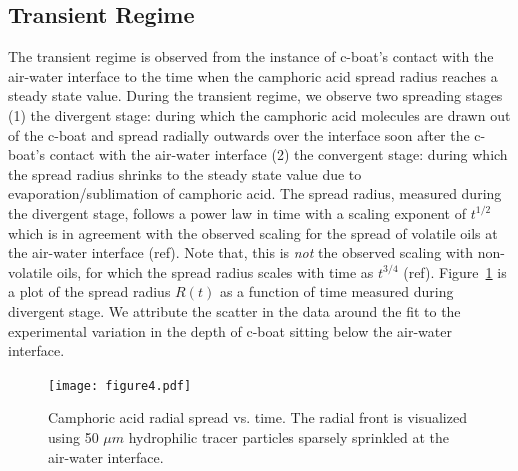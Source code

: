 \documentclass[aps, twocolumn, floatfix, superscriptaddress]{revtex4}
\begin{document}
\subsection{Transient Regime}
\label{sec:transient}
The transient regime is observed from the instance of c-boat's contact with the air-water interface to the time when the camphoric acid spread radius reaches a steady state value. During the transient regime, we observe two spreading stages (1) the divergent stage: during which the camphoric acid molecules are drawn out of the c-boat and spread radially outwards over the interface soon after the c-boat's contact with the air-water interface (2) the convergent stage: during which the spread radius shrinks to the steady state value due to evaporation/sublimation of camphoric acid. The spread radius, measured during the divergent stage, follows a power law in time with a scaling exponent of $t^{1/2}$ which is in agreement with the observed scaling for the spread of volatile oils at the air-water interface (ref). Note that, this is \emph{not} the observed scaling with non-volatile oils, for which the spread radius scales with time as $t^{3/4}$ (ref). Figure~\ref{fig:caspread} is a plot of the spread radius $R(t)$ as a function of time measured during divergent stage. We attribute the scatter in the data around the fit to the experimental variation in the depth of c-boat sitting below the air-water interface.   

\begin{figure}[ht]
    \begin{center}
       \texttt{[image: figure4.pdf]}
    \end{center}
    \caption{Camphoric acid radial spread vs. time. The radial front is visualized using 50 $\mu m$ hydrophilic tracer particles sparsely sprinkled at the air-water interface. }
    \label{fig:caspread}
\end{figure}
\end{document}
